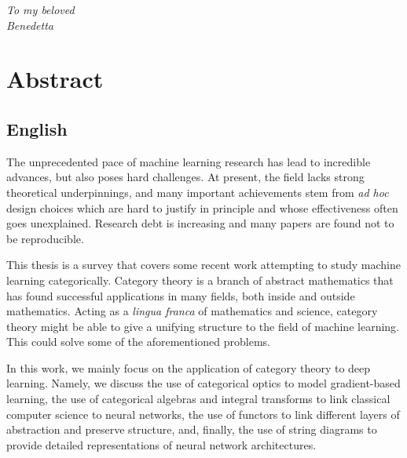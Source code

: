 \documentclass[11pt,a4paper,openright,twoside]{report}
\theoremstyle{plain}
\theoremstyle{definition}
\begin{document}



\begin{titlepage}
\thispagestyle{empty}                   
\topmargin=6.5cm                        
\raggedleft                             
\large 
                                 
                                       
\em                                     
To my beloved\\
Benedetta                   
\newpage                                

\clearpage{\pagestyle{empty}\cleardoublepage}
\end{titlepage}



\chapter*{Abstract}   


\section*{English}

The unprecedented pace of machine learning research has lead to incredible advances, but also poses hard challenges. At present, the field lacks strong theoretical underpinnings, and many important achievements stem from \textit{ad hoc} design choices which are hard to justify in principle and whose effectiveness often goes unexplained. Research debt is increasing and many papers are found not to be reproducible. 

This thesis is a survey that covers some recent work attempting to study machine learning categorically. Category theory is a branch of abstract mathematics that has found successful applications in many fields, both inside and outside mathematics. Acting as a \textit{lingua franca} of mathematics and science, category theory might be able to give a unifying structure to the field of machine learning. This could solve some of the aforementioned problems. 

In this work, we mainly focus on the application of category theory to deep learning. Namely, we discuss the use of categorical optics to model gradient-based learning, the use of categorical algebras and integral transforms to link classical computer science to neural networks, the use of functors to link different layers of abstraction and preserve structure, and, finally, the use of string diagrams to provide detailed representations of neural network architectures.
\end{document}
